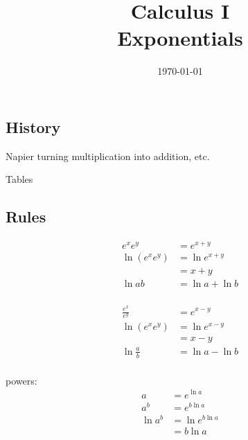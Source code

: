 \documentclass[letterpaper, landscape]{exam}
\author{}
\date{\today}
\title{Calculus I \\ Exponentials}
\begin{document}
  \maketitle
  \tableofcontents

  \subsection{History} %
  
  \begin{itemize*}
    \item Napier turning multiplication into addition, etc.
    \item Tables
  \end{itemize*}
  
  \subsection{Rules} %
  
  \begin{align*}
    e^x e^y                    & = e^{x + y} \\
    \ln \left( e^x e^y \right) & = \ln e^{x + y} \\
                               & = x + y
    \\
    \ln ab &= \ln a + \ln b \\
  \end{align*}

  \begin{align*}
    \frac{e^x}{e^y}             & = e^{x - y} \\
    \ln \left( e^x e^y \right)  & = \ln e^{x - y} \\
                                & = x - y
    \\
    \ln \frac{a}{b}             & = \ln a - \ln b \\
  \end{align*}

  powers:
  \begin{align*}
    a       & = e^{\ln a} \\
    a^b     & = e^{b \ln a} \\
    \ln a^b & = \ln e^{b \ln a} \\
            & = b \ln a \\
  \end{align*}

  
\end{document}
